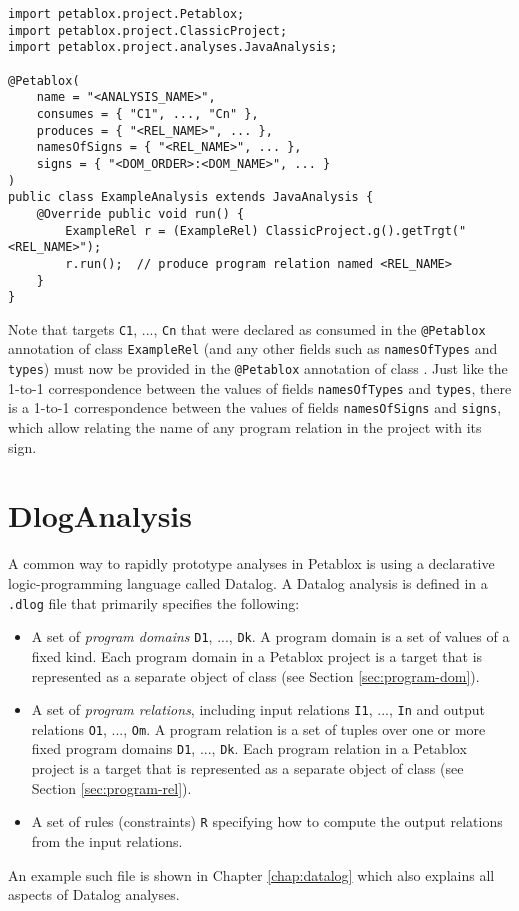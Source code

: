 \begin{framed}
\begin{verbatim}
import petablox.project.Petablox;
import petablox.project.ClassicProject;
import petablox.project.analyses.JavaAnalysis;

@Petablox(
    name = "<ANALYSIS_NAME>",
    consumes = { "C1", ..., "Cn" },
    produces = { "<REL_NAME>", ... },
    namesOfSigns = { "<REL_NAME>", ... },
    signs = { "<DOM_ORDER>:<DOM_NAME>", ... }
)
public class ExampleAnalysis extends JavaAnalysis {
    @Override public void run() {
        ExampleRel r = (ExampleRel) ClassicProject.g().getTrgt("<REL_NAME>");
        r.run();  // produce program relation named <REL_NAME>
    }
}
\end{verbatim}
\end{framed}

Note that targets {\tt C1}, ..., {\tt Cn} that were declared as consumed in
the {\tt @Petablox} annotation of class {\tt ExampleRel} (and any other fields
such as {\tt namesOfTypes} and {\tt types}) must now be provided in the
{\tt @Petablox} annotation of class .  Just like the
1-to-1 correspondence between the values of fields {\tt namesOfTypes} and
{\tt types}, there is a 1-to-1 correspondence between the values of fields
{\tt namesOfSigns} and {\tt signs}, which allow relating the name of any program
relation in the project with its sign.

\section{DlogAnalysis}
\label{sec:dlog}

A common way to rapidly prototype analyses in Petablox is using a declarative
logic-programming language called Datalog.  A Datalog analysis is defined in a
{\tt .dlog} file that primarily specifies the following:
\begin{itemize}
\item
A set of {\it program domains} {\tt D1}, ..., {\tt Dk}.  A program domain is a
set of values of a fixed kind.  Each program domain in a Petablox project is
a target that is represented as a separate object of class 
(see Section \ref{sec:program-dom}).
\item
A set of {\it program relations}, including input relations {\tt I1}, ..., {\tt In}
and output relations {\tt O1}, ..., {\tt Om}.  A program relation is a set of
tuples over one or more fixed program domains {\tt D1}, ..., {\tt Dk}.  Each program
relation in a Petablox project is a target that is represented as a separate object
of class  (see Section \ref{sec:program-rel}).
\item
A set of rules (constraints) {\tt R} specifying how to compute the output
relations from the input relations.
\end{itemize}
An example such file is shown in Chapter \ref{chap:datalog} which also
explains all aspects of Datalog analyses.

